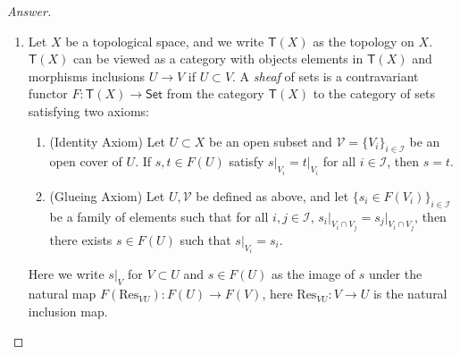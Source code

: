 \documentclass[12pt]{amsart}
\begin{document}
\begin{proof}
	[Answer]\begin{enumerate}
		\item Let $X$ be a topological space, and we write $\mathsf{T} (X)$ as the topology on $X$. $\mathsf{T} (X)$ can be viewed as a category with objects elements in $\mathsf{T} (X)$ and morphisms inclusions $U\rightarrow V$ if $U\subset V$. A \emph{sheaf} of sets is a contravariant functor $F\colon\mathsf{T} (X)\to\mathsf{Set} $ from the category $\mathsf{T} (X)$ to the category of sets satisfying two axioms:
		\begin{enumerate}
			\item (Identity Axiom) Let $U\subset X$ be an open subset and $\mathcal{V} =\{V_i\}_{i\in\mathcal{I} } $ be an open cover of $U$. If $s,t\in F(U)$ satisfy $s\vert_{V_i } =t\vert_{V_i } $ for all $i\in\mathcal{I} $, then $s=t$.
			\item (Glueing Axiom) Let $U,\mathcal{V} $ be defined as above, and let $\{s_i\in F(V_i )\}_{i\in\mathcal{I} } $ be a family of elements such that for all $i,j\in\mathcal{I} $, $s_i\vert_{V_i\cap V_j }=s_j\vert_{V_i\cap V_j} $, then there exists $s\in F(U)$ such that $s\vert_{V_i } =s_i  $.
		\end{enumerate}
	Here we write $s\vert_V $ for $V\subset U$ and $s\in F(U)$ as the image of $s$ under the natural map $F(\mathrm{Res}_{VU} )\colon F(U)\to F(V)$, here $\mathrm{Res}_{VU}\colon V\to U$ is the natural inclusion map.
	

\end{enumerate}
\end{proof}
\end{document}
